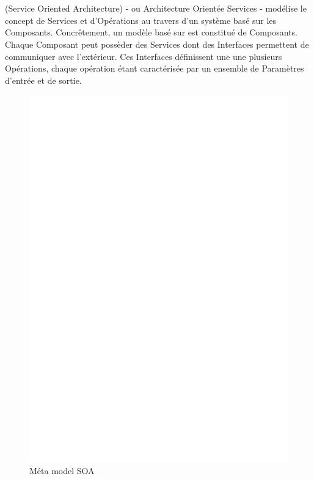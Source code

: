 \section{\kwsoa}\label{sub:soa}

\kwsoa (Service Oriented Architecture) - ou Architecture Orientée Services - modélise le concept de Services et d'Opérations au travers d'un système basé sur les Composants. Concrêtement, un modèle basé sur \kwsoa est constitué de Composants. Chaque Composant peut possèder des Services dont des Interfaces permettent de communiquer avec l'extérieur. Ces Interfaces définissent une une plusieurs Opérations, chaque opération étant caractérisée par un ensemble de Paramètres d'entrée et de sortie.

\begin{figure}[htb]
  \centering
  \includegraphics[scale=.3]{img/SOA.eps}
  \caption{Méta model SOA}
  \label{fig:soa}
\end{figure}

